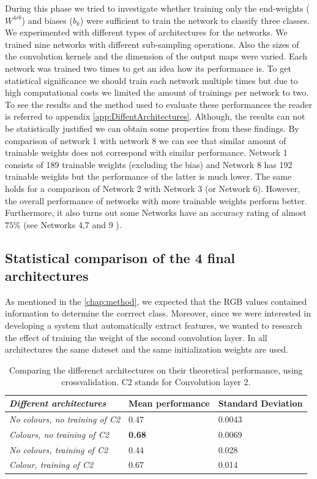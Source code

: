 \documentclass[a4paper,onecolumn]{report}
\begin{document}
During this phase we tried to investigate whether training only the end-weights ($W^{4rb}$) and biases ($b_{k}$) were sufficient to train the network to classify three classes. We experimented with different types of architectures for the networks. We trained nine networks with different sub-sampling operations. Also the sizes of the convolution kernels and the dimension of the output maps were varied. Each network was trained two times to get an idea how its performance is. To get statistical significance we should train each network multiple times but due to high computational costs we limited the amount of trainings per network to two. To see the results and the method used to evaluate these performances the reader is referred to appendix \ref{app:DiffentArchitectures}. Although, the results can not be statistically justified we can obtain some properties from these findings. By comparison of network 1 with network 8 we can see that similar amount of trainable weights does not correspond with similar performance. Network 1 consists of 189 trainable weights (excluding the bias) and Network 8 has 192  trainable weights but the performance of the latter is much lower. The same holds for a comparison of Network 2 with Network 3 (or Network 6). However, the overall performance of networks with more trainable weights perform better. Furthermore, it also turns out some Networks have an accuracy rating of almost $75$\% (see Networks 4,7 and 9 ). 


\subsection{Statistical comparison of the 4 final architectures}
As mentioned in the \ref{chap:method}, we expected that the RGB values contained information to determine the corrrect class. Moreover, since we were interested in developing a system that automatically extract features, we wanted to research the effect of training the weight of the second convolution layer. In all architectures the same dateset and the same initialization weights are used.  \\

\begin{table}[h!]
\begin{tabular}{ | l | l | l | }
\hline
	\textbf{\textit{Different architectures}} & \textbf{Mean performance} &\textbf{Standard Deviation}   \\ \hline
	\textit{No colours, no training of C2 }& 0.47 & 0.0043 \\ \hline
	\textit{Colours, no training of C2} & \textbf{0.68}& 0.0069 \\ \hline
	\textit{No colours, training of C2} & 0.44 & 0.028 \\ \hline
	\textit{Colour, training of C2} & 0.67 & 0.014 \\ \hline
\end{tabular}
\caption{Comparing the differenct architectures on their theoretical performance, using crossvalidation. C2 stands for Convolution layer 2.}
\label{tab:crossvalidation results}
\end{table}
\end{document}

